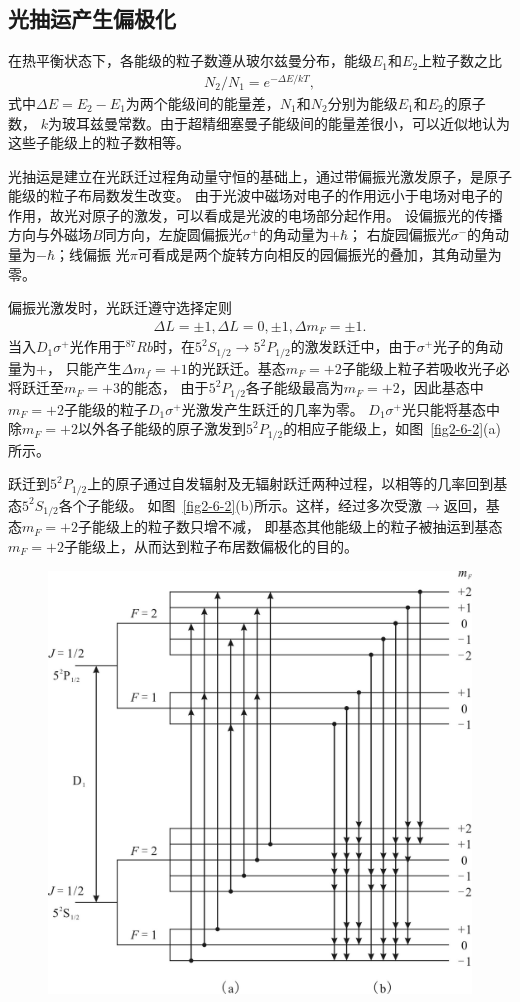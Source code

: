 \documentclass[11pt,a4paper]{article}
\begin{document}
\begin{spacing}{1.3}
\begin{CJK*}{UTF8}{gbsn}
\subsection{光抽运产生偏极化}
在热平衡状态下，各能级的粒子数遵从玻尔兹曼分布，能级$E_1$和$E_2$上粒子数之比
\begin{eqnarray} \label{2-6-6}
N_2/N_1=e^{-\Delta E/kT},
\end{eqnarray}
式中$\Delta E=E_2-E_1$为两个能级间的能量差，$N_1$和$N_2$分别为能级$E_1$和$E_2$的原子数，
$k$为玻耳兹曼常数。由于超精细塞曼子能级间的能量差很小，可以近似地认为这些子能级上的粒子数相等。\par
光抽运是建立在光跃迁过程角动量守恒的基础上，通过带偏振光激发原子，是原子能级的粒子布局数发生改变。
由于光波中磁场对电子的作用远小于电场对电子的作用，故光对原子的激发，可以看成是光波的电场部分起作用。
设偏振光的传播方向与外磁场$B$同方向，左旋圆偏振光$\sigma^+$的角动量为$+\hbar$；
右旋园偏振光$\sigma^-$的角动量为$-\hbar$；线偏振 光$\pi$可看成是两个旋转方向相反的园偏振光的叠加，其角动量为零。
\par 
偏振光激发时，光跃迁遵守选择定则
\begin{eqnarray} \label{2-6-7}
\Delta L=\pm 1,\Delta L=0,\pm1,\Delta m_F=\pm1.
\end{eqnarray}
当入$D_1\sigma^+$光作用于$^{87}Rb$时，在$5^2S_{1/2} \to 5^2P_{1/2}$的激发跃迁中，由于$\sigma^+$光子的角动量为+，
只能产生$\Delta m_f=+1$的光跃迁。基态$m_F=+2$子能级上粒子若吸收光子必将跃迁至$m_F=+3$的能态，
由于$5^2P_{1/2}$各子能级最高为$m_F=+2$，因此基态中$m_F=+2$子能级的粒子$D_1\sigma^+$光激发产生跃迁的几率为零。
$D_1\sigma^+$光只能将基态中除$m_F = +2$以外各子能级的原子激发到$5^2P_{1/2}$的相应子能级上，如图~\ref{fig2-6-2}(a)所示。\par
跃迁到$5^2P_{1/2}$上的原子通过自发辐射及无辐射跃迁两种过程，以相等的几率回到基态$5^2S_{1/2}$各个子能级。
如图~\ref{fig2-6-2}(b)所示。这样，经过多次受激$\to$返回，基态$m_F=+2$子能级上的粒子数只增不减，
即基态其他能级上的粒子被抽运到基态$m_F=+2$子能级上，从而达到粒子布居数偏极化的目的。
 \begin{figure}[!htbp]
\centering
\includegraphics[width=.6\textwidth]{fig2-6-2}

\end{figure}
\end{CJK*}
\end{spacing}
\end{document}
